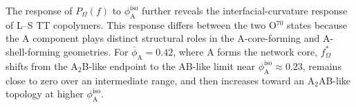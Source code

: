 The response of $P_\Omega(f)$ to $\phi_{\mathrm A}^{\mathrm{iso}}$ further reveals the interfacial-curvature response of L--S TT copolymers.
This response differs between the two O$^{70}$ states because the A component plays distinct structural roles in the A-core-forming and A-shell-forming geometries.
For $\bar{\phi}_{\mathrm A}=0.42$, where A forms the network core, $f_\Omega^\ast$ shifts from the A$_2$B-like endpoint to the AB-like limit near $\phi_{\mathrm A}^{\mathrm{iso}}\approx0.23$, remains close to zero over an intermediate range, and then increases toward an A$_2$AB-like topology at higher $\phi_{\mathrm A}^{\mathrm{iso}}$.
